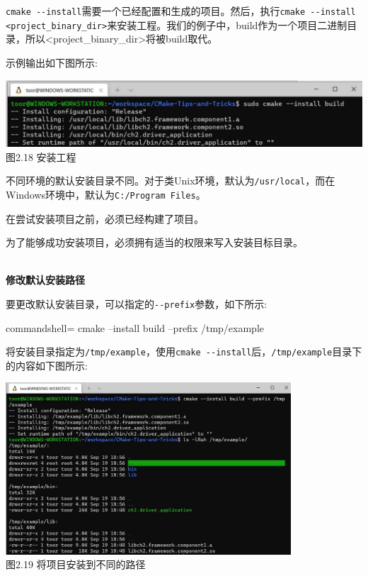 \texttt{cmake -{}-install}需要一个已经配置和生成的项目。然后，执行\texttt{cmake -{}-install <project\_binary\_dir>}来安装工程。我们的例子中，build作为一个项目二进制目录，所以<project\_binary\_dir>将被build取代。

示例输出如下图所示:

\begin{center}
\includegraphics[width=1.\textwidth]{content/1/chapter2/images/18.jpg}\\
图2.18 安装工程
\end{center}

不同环境的默认安装目录不同。对于类Unix环境，默认为\texttt{/usr/local}，而在Windows环境中，默认为\texttt{C:/Program Files}。

\begin{tcolorbox}[colback=webgreen!5!white,colframe=webgreen!75!black,title=Tip]
在尝试安装项目之前，必须已经构建了项目。

为了能够成功安装项目，必须拥有适当的权限来写入安装目标目录。
\end{tcolorbox}

\hspace*{\fill} \\ %
\noindent
\textbf{修改默认安装路径}

要更改默认安装目录，可以指定的\texttt{-{}-prefix}参数，如下所示:

\begin{tcblisting}{commandshell={}}
cmake --install build --prefix /tmp/example
\end{tcblisting}

将安装目录指定为\texttt{/tmp/example}，使用\texttt{cmake -{}-install}后，\texttt{/tmp/example}目录下的内容如下图所示:

\begin{center}
\includegraphics[width=0.8\textwidth]{content/1/chapter2/images/19.jpg}\\
图2.19 将项目安装到不同的路径
\end{center}

